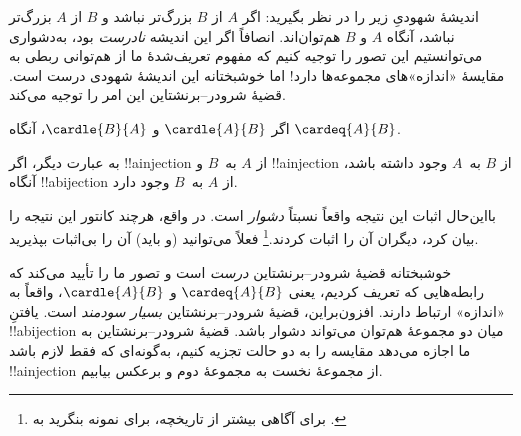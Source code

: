 \documentclass[../../../include/open-logic-section]{subfiles}
\begin{document}


\begin{explain}
اندیشهٔ شهودیِ زیر را در نظر بگیرید: اگر $A$ از $B$ بزرگ‌تر نباشد و
$B$ از $A$ بزرگ‌تر نباشد، آنگاه $A$ و $B$ هم‌توان‌اند. انصافاً اگر این
اندیشه \emph{نادرست} بود، به‌دشواری می‌توانستیم این تصور را توجیه کنیم
که مفهوم تعریف‌شدهٔ ما از هم‌توانی ربطی به مقایسهٔ «اندازه»های
مجموعه‌ها دارد!{} اما خوشبختانه این اندیشهٔ شهودی درست است. قضیهٔ
شرودر–برنشتاین این امر را توجیه می‌کند.
\end{explain}

\begin{thm}
	اگر $\cardle{A}{B}$ و $\cardle{B}{A}$،
	آنگاه $\cardeq{A}{B}$.
\end{thm}

\begin{explain}
به عبارت دیگر، اگر !!a{injection} از $A$ به~$B$ و !!a{injection} از
$B$ به~$A$ وجود داشته باشد، آنگاه !!a{bijection} از $A$ به~$B$ وجود
دارد.

بااین‌حال اثبات این نتیجه واقعاً نسبتاً \emph{دشوار} است. در واقع،
هرچند کانتور این نتیجه را بیان کرد، دیگران آن را اثبات
کردند.\footnote{برای آگاهی بیشتر از تاریخچه، برای نمونه بنگرید به
\citet[صص.~165--6]{Potter2004}.}
%
فعلاً می‌توانید (و باید) آن را بی‌اثبات بپذیرید.

خوشبختانه قضیهٔ شرودر–برنشتاین \emph{درست} است و تصور ما را تأیید
می‌کند که رابطه‌هایی که تعریف کردیم، یعنی $\cardeq{A}{B}$ و
$\cardle{A}{B}$، واقعاً به «اندازه» ارتباط دارند. افزون‌براین، قضیهٔ
شرودر–برنشتاین \emph{بسیار سودمند} است. یافتنِ !!a{bijection} میان دو
مجموعهٔ هم‌توان می‌تواند دشوار باشد. قضیهٔ شرودر–برنشتاین به ما اجازه
می‌دهد مقایسه را به دو حالت تجزیه کنیم، به‌گونه‌ای که فقط لازم باشد
!!a{injection} از مجموعهٔ نخست به مجموعهٔ دوم و برعکس بیابیم.
\end{explain}
\end{document}

